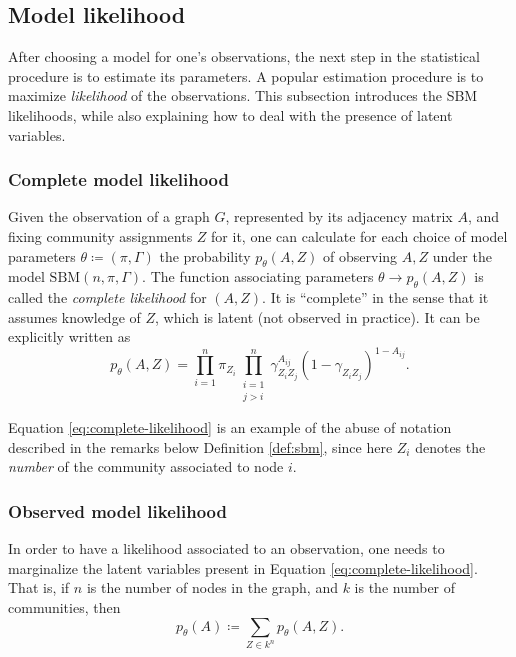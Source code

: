 \documentclass[../../main.tex]{subfiles} %
\begin{document}
\subsection{Model likelihood}
After choosing a model for one's observations, the next step in the statistical 
procedure is to estimate its parameters. A popular estimation procedure is to 
maximize \textit{likelihood} of the observations. This subsection introduces 
the 
SBM likelihoods, while also explaining how to deal with the presence of latent 
variables.

\subsubsection{Complete model likelihood}
Given the observation of a graph \(G\), represented by its adjacency matrix 
\(A\), and fixing community assignments \(Z\) for it, one can calculate for 
each 
choice of model parameters \(\theta \coloneqq (\pi, \Gamma)\) the 
probability \(p_{\theta} (A, Z)\) of observing \(A, Z\) under the model 
\(\text{SBM}(n, \pi, 
\Gamma)\). 
The function associating parameters \(\theta \to p_{\theta} (A, 
Z)\) is called the \textit{complete likelihood} for \((A, Z)\). It is ``complete'' in 
the sense that it assumes knowledge of \(Z\), which is latent (not observed in 
practice). It can be explicitly written as
\begin{equation} \label{eq:complete-likelihood}
	p_{\theta}(A, Z) = \prod_{i=1}^{n} \pi_{Z_i} \prod_{\substack{i=1 \\ 
	j>i}}^n 
	\gamma_{Z_i 
		Z_j}^{A_{ij}} (1 - \gamma_{Z_i Z_j})^{1 - A_{ij}}.
\end{equation}

\begin{remark}
	Equation \eqref{eq:complete-likelihood} is an example of the abuse of 
	notation described in the remarks below Definition \ref{def:sbm}, 
	since here 
	\(Z_i\) denotes the \textit{number} of the community associated to 
	node \(i\).
\end{remark}

\subsubsection{Observed model likelihood}
In order to have a likelihood associated to an observation, one needs to 
marginalize the latent variables present in Equation 
\eqref{eq:complete-likelihood}. That is, if \(n\) is the number of 
nodes in the 
graph, and \(k\) is the number of communities, then
\begin{equation} \label{eq:observed-likelihood}
	p_\theta(A) \coloneqq \sum_{Z \in k^n} p_\theta(A, Z).
\end{equation}
\end{document}
